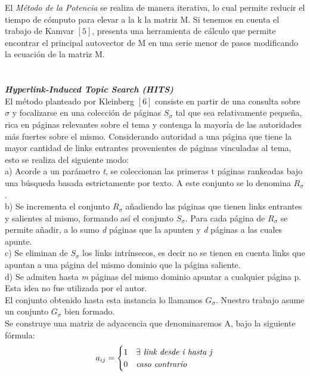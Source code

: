 \documentclass[a4paper]{article}
\begin{document}
\indent El\emph{ M\'etodo de la Potencia} se realiza de manera iterativa, lo cual permite reducir el tiempo de c\'omputo para elevar a la k la matriz M. Si tenemos en cuenta el trabajo de Kamvar $[5]$, presenta una herramienta de c\'alculo que permite encontrar el principal autovector de M en una serie menor de pasos modificando la ecuaci\'on de la matriz M.\\
\\
\\
\indent \indent \emph{\textbf{Hyperlink-Induced Topic Search (HITS)}} \\
\indent El m\'etodo planteado por Kleinberg $[6]$ consiste en partir de una consulta sobre $\sigma$ y focalizarse en una colecci\'on de p\'aginas $S_\sigma$ tal que sea relativamente peque\~na,  rica en p\'aginas relevantes sobre el tema y contenga la mayor\'ia de las autoridades m\'as fuertes sobre el mismo. Considerando autoridad a una p\'agina que tiene la mayor cantidad de links entrantes provenientes de p\'aginas vinculadas al tema, esto se realiza del siguiente modo:\\
a) Acorde a un par\'ametro \emph{t}, se coleccionan las primeras t p\'aginas rankeadas bajo una b\'usqueda basada estrictamente por texto. A este conjunto se lo denomina $R_\sigma$. \\
b) Se incrementa el conjunto $R_\sigma$ a\~nadiendo las p\'aginas que tienen links entrantes y salientes al mismo, formando as\'i el conjunto $S_\sigma$. Para cada p\'agina de $R_\sigma$ se permite a\~nadir, a lo sumo \emph{d} p\'aginas que la apunten y \emph{d} p\'aginas a las cuales apunte. \\
c) Se eliminan de $S_\sigma$ los links intr\'insecos, es decir no se tienen en cuenta links que apuntan a una p\'agina del mismo dominio que la p\'agina saliente. \\
d) Se admiten hasta \emph{m} p\'aginas del mismo dominio apuntar a cualquier p\'agina p. Esta idea no fue utilizada por el autor. \\
\indent El conjunto obtenido hasta esta instancia lo llamamos $G_\sigma$. Nuestro trabajo asume un conjunto $G_\sigma$ bien formado.\\
\indent Se construye una matriz de adyacencia que denominaremos A, bajo la siguiente f\'ormula:
\[
   a_{ij} = 
   \begin{cases} 
      1              & \exists$\textit{ link desde i hasta j}$   \\
      0 & $\textit{caso contrario}$
   \end{cases}
\]
\end{document}
